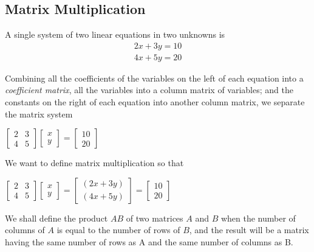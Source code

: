 \documentclass[11pt]{article}
\theoremstyle{definition}
\begin{document}
	\pagebreak
	\subsection{Matrix Multiplication}
		A single system of two linear equations in two unknowns is 
		\begin{align*}
			2x + 3y = 10 \\
			4x + 5y = 20
		\end{align*}
		
		Combining all the coefficients of the variables on the left of each equation into a \textit{coefficient matrix}, all the variables into a column matrix of variables; and the constants on the right of each equation into another column matrix, we separate the matrix system
		\begin{center}
			$\begin{bmatrix}
			2 & 3 \\ 4 & 5
			\end{bmatrix}
			\begin{bmatrix}
			x \\ y
			\end{bmatrix}
			= \begin{bmatrix}
			10 \\ 20
			\end{bmatrix}$
		\end{center}
		
		We want to define matrix multiplication so that 
		\begin{center}
			$\begin{bmatrix}
			2 & 3 \\ 4 & 5
			\end{bmatrix}
			\begin{bmatrix}
			x \\ y
			\end{bmatrix}
			=\begin{bmatrix}
			(2x + 3y) \\ (4x + 5y)
			\end{bmatrix}
			= \begin{bmatrix}
			10 \\ 20
			\end{bmatrix}$
		\end{center}
	
		We shall define the product $AB$ of two matrices $A$ and $B$ when the number of columns of $A$ is equal to the number of rows of $B$, and the result will be a matrix having the same number of rows as A and the same number of columns as B.
		
\end{document}
